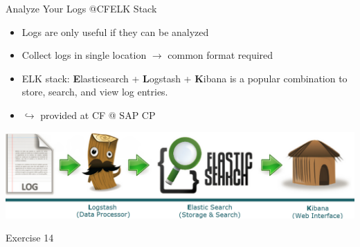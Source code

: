 \begin{frame}{Analyze Your Logs @CF}{ELK Stack}
\begin{itemize}
\item Logs are only useful if they can be analyzed 
\item Collect logs in single location $\rightarrow$ common format required
\item ELK stack: \textbf{E}lasticsearch + \textbf{L}ogstash + \textbf{K}ibana is a popular combination to store, search, and view log entries.
\item[] $\hookrightarrow$ provided at CF @ SAP CP
\end{itemize}
\vfill
\includegraphics[width=\textwidth]{../LoggingTracing/images/ELK}
\end{frame}

\begin{frame}{Exercise 14}
\begin{figure}
	\end{figure}
\end{frame}


